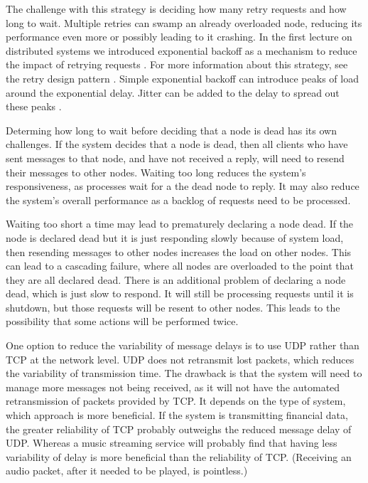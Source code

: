 The challenge with this strategy is deciding how many retry requests and how long to wait.
Multiple retries can swamp an already overloaded node, reducing its performance even more or possibly leading to it crashing.
In the first lecture on distributed systems we introduced exponential backoff as a mechanism to reduce the impact of retrying requests \cite{distributed1-slides}.
For more information about this strategy, see the retry design pattern \cite{retry-pattern}.
Simple exponential backoff can introduce peaks of load around the exponential delay.
Jitter can be added to the delay to spread out these peaks \cite{backoff-jitter}.

Determing how long to wait before deciding that a node is dead has its own challenges.
If the system decides that a node is dead,
then all clients who have sent messages to that node, and have not received a reply, will need to resend their messages to other nodes.
Waiting too long reduces the system's responsiveness, as processes wait for a the dead node to reply.
It may also reduce the system's overall performance as a backlog of requests need to be processed.

Waiting too short a time may lead to prematurely declaring a node dead.
If the node is declared dead but it is just responding slowly because of system load,
then resending messages to other nodes increases the load on other nodes.
This can lead to a cascading failure, where all nodes are overloaded to the point that they are all declared dead.
There is an additional problem of declaring a node dead, which is just slow to respond.
It will still be processing requests until it is shutdown, but those requests will be resent to other nodes.
This leads to the possibility that some actions will be performed twice.

One option to reduce the variability of message delays is to use UDP rather than TCP at the network level.
UDP does not retransmit lost packets, which reduces the variability of transmission time.
The drawback is that the system will need to manage more messages not being received,
as it will not have the automated retransmission of packets provided by TCP.
It depends on the type of system, which approach is more beneficial.
If the system is transmitting financial data, the greater reliability of TCP probably outweighs the reduced message delay of UDP.
Whereas a music streaming service will probably find that having less variability of delay is more beneficial than the reliability of TCP.
(Receiving an audio packet, after it needed to be played, is pointless.)

